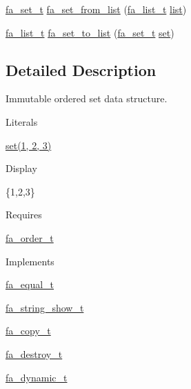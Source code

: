 \begin{DoxyCompactItemize}
\item 
\hyperlink{group___fa_set_ga7a64878223baf48e12857d8d5fda700c}{fa\-\_\-set\-\_\-t} \hyperlink{group___fa_set_ga6d94d154eb89d3cbcc06fd76b1c9a148}{fa\-\_\-set\-\_\-from\-\_\-list} (\hyperlink{group___fa_list_ga35ecb12ab934ded0cce0bcf28e3bc5d2}{fa\-\_\-list\-\_\-t} \hyperlink{literals_8h_a4ddd63dfcfec2b4d5741a56aa6003c76}{list})
\item 
\hyperlink{group___fa_list_ga35ecb12ab934ded0cce0bcf28e3bc5d2}{fa\-\_\-list\-\_\-t} \hyperlink{group___fa_set_gad3f3aa6a2e1b064d285c4084f6cc6647}{fa\-\_\-set\-\_\-to\-\_\-list} (\hyperlink{group___fa_set_ga7a64878223baf48e12857d8d5fda700c}{fa\-\_\-set\-\_\-t} \hyperlink{literals_8h_aca648353520d62f775c6a6ee83741fe4}{set})
\end{DoxyCompactItemize}


\subsection{Detailed Description}
Immutable ordered set data structure. \begin{DoxyParagraph}{Literals}

\begin{DoxyItemize}
\item {\ttfamily \hyperlink{literals_8h_aca648353520d62f775c6a6ee83741fe4}{set(1, 2, 3)}}
\end{DoxyItemize}
\end{DoxyParagraph}
\begin{DoxyParagraph}{Display}

\begin{DoxyItemize}
\item {\ttfamily \{1,2,3\}}
\end{DoxyItemize}
\end{DoxyParagraph}
\begin{DoxyParagraph}{Requires }

\begin{DoxyItemize}
\item \hyperlink{structfa__order__t}{fa\-\_\-order\-\_\-t}
\end{DoxyItemize}
\end{DoxyParagraph}
\begin{DoxyParagraph}{Implements }

\begin{DoxyItemize}
\item \hyperlink{structfa__equal__t}{fa\-\_\-equal\-\_\-t}
\item \hyperlink{structfa__string__show__t}{fa\-\_\-string\-\_\-show\-\_\-t}
\item \hyperlink{structfa__copy__t}{fa\-\_\-copy\-\_\-t}
\item \hyperlink{structfa__destroy__t}{fa\-\_\-destroy\-\_\-t}
\item \hyperlink{structfa__dynamic__t}{fa\-\_\-dynamic\-\_\-t}
\end{DoxyItemize}
\end{DoxyParagraph}
